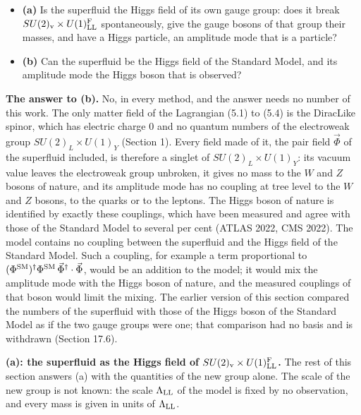 \documentclass[
  10pt,
]{article}
\providecommand{\tightlist}{%
  \setlength{\itemsep}{0pt}\setlength{\parskip}{0pt}}
\begin{document}
\begin{itemize}
\tightlist
\item
  \textbf{(a)} Is the superfluid the Higgs field of its own gauge group:
  does it break \(SU(2)_{\rm v}\times U(1)^{\rm F}_{\rm LL}\)
  spontaneously, give the gauge bosons of that group their masses, and
  have a Higgs particle, an amplitude mode that is a particle?
\item
  \textbf{(b)} Can the superfluid be the Higgs field of the Standard
  Model, and its amplitude mode the Higgs boson that is observed?
\end{itemize}

\textbf{The answer to (b).} No, in every method, and the answer needs no
number of this work. The only matter field of the Lagrangian (5.1) to
(5.4) is the DiracLike spinor, which has electric charge 0 and no
quantum numbers of the electroweak group \(SU(2)_L\times U(1)_Y\)
(Section 1). Every field made of it, the pair field \(\vec\Phi\) of the
superfluid included, is therefore a singlet of \(SU(2)_L\times U(1)_Y\):
its vacuum value leaves the electroweak group unbroken, it gives no mass
to the \(W\) and \(Z\) bosons of nature, and its amplitude mode has no
coupling at tree level to the \(W\) and \(Z\) bosons, to the quarks or
to the leptons. The Higgs boson of nature is identified by exactly these
couplings, which have been measured and agree with those of the Standard
Model to several per cent (ATLAS 2022, CMS 2022). The model contains no
coupling between the superfluid and the Higgs field of the Standard
Model. Such a coupling, for example a term proportional to
\((\Phi^{\rm SM})^\dagger\Phi^{\rm SM}\,\vec\Phi^\dagger\cdot\vec\Phi\),
would be an addition to the model; it would mix the amplitude mode with
the Higgs boson of nature, and the measured couplings of that boson
would limit the mixing. The earlier version of this section compared the
numbers of the superfluid with those of the Higgs boson of the Standard
Model as if the two gauge groups were one; that comparison had no basis
and is withdrawn (Section 17.6).

\textbf{(a): the superfluid as the Higgs field of
\(SU(2)_{\rm v}\times U(1)^{\rm F}_{\rm LL}\).} The rest of this section
answers (a) with the quantities of the new group alone. The scale of the
new group is not known: the scale \(\Lambda_{\rm LL}\) of the model is
fixed by no observation, and every mass is given in units of
\(\Lambda_{\rm LL}\).
\end{document}

